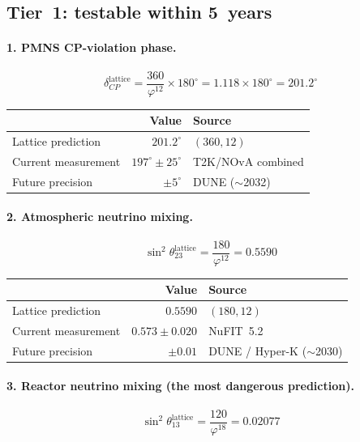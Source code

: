 \documentclass[12pt,a4paper]{article}
\newcommand{\vp}{\varphi}
\begin{document}
\subsection{Tier~1: testable within 5~years}

\paragraph{1. PMNS CP-violation phase.}
\begin{equation}
  \delta_{CP}^{\mathrm{lattice}} = \frac{360}{\vp^{12}} \times 180^\circ
  = 1.118 \times 180^\circ = \mathbf{201.2^\circ}
\end{equation}

\begin{table}[H]
\centering
\begin{tabular}{@{}lrl@{}}
\toprule
 & Value & Source \\
\midrule
Lattice prediction    & $201.2^\circ$ & $(360, 12)$ \\
Current measurement   & $197^\circ \pm 25^\circ$ & T2K/NOvA combined \\
Future precision      & $\pm 5^\circ$ & DUNE ($\sim$2032) \\
\bottomrule
\end{tabular}
\end{table}

\paragraph{2. Atmospheric neutrino mixing.}
\begin{equation}
  \sin^2\theta_{23}^{\mathrm{lattice}} = \frac{180}{\vp^{12}} = \mathbf{0.5590}
\end{equation}

\begin{table}[H]
\centering
\begin{tabular}{@{}lrl@{}}
\toprule
 & Value & Source \\
\midrule
Lattice prediction    & $0.5590$ & $(180, 12)$ \\
Current measurement   & $0.573 \pm 0.020$ & NuFIT~5.2 \\
Future precision      & $\pm 0.01$ & DUNE / Hyper-K ($\sim$2030) \\
\bottomrule
\end{tabular}
\end{table}

\paragraph{3. Reactor neutrino mixing (the most dangerous prediction).}
\begin{equation}
  \sin^2\theta_{13}^{\mathrm{lattice}} = \frac{120}{\vp^{18}} = \mathbf{0.02077}
\end{equation}
\end{document}
